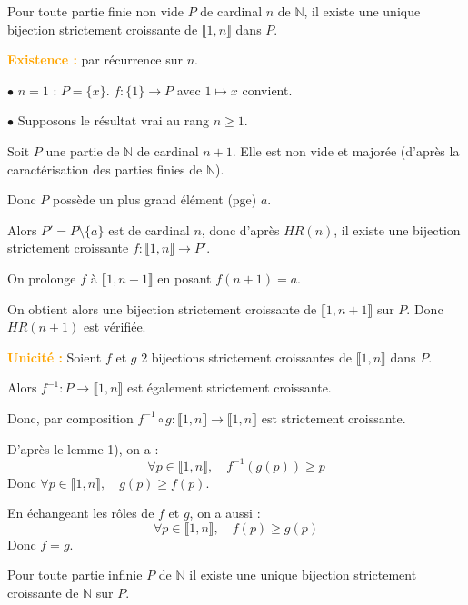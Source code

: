 \documentclass[a4paper,11pt]{article}
\newcommand{\N}{\mathbb{N}}
\newcommand{\cas}[1]{\textbf{\textcolor{orange}{#1}}}
\begin{document}
\begin{proposition}[1]
    Pour toute partie finie non vide $P$ de cardinal $n$ de $\N$, il existe une unique bijection strictement croissante de $\llbracket 1, n \rrbracket$ dans $P$.
\end{proposition}

\begin{demonstration}
    \cas{Existence :} par récurrence sur $n$.
    
    $\bullet$ $n=1$ : $P=\{x\}$. $f : \{1\} \to P$ avec $1 \mapsto x$ convient.
    
    $\bullet$ Supposons le résultat vrai au rang $n \ge 1$.
    
    Soit $P$ une partie de $\N$ de cardinal $n+1$.
    Elle est non vide et majorée (d'après la caractérisation des parties finies de $\N$).
    
    Donc $P$ possède un plus grand élément (pge) $a$.
    
    Alors $P' = P \setminus \{a\}$ est de cardinal $n$, donc d'après $HR(n)$, il existe une bijection strictement croissante $f : \llbracket 1, n \rrbracket \to P'$. 
    
    On prolonge $f$ à $\llbracket 1, n+1 \rrbracket$ en posant $f(n+1) = a$.
    
    On obtient alors une bijection strictement croissante de $\llbracket 1, n+1 \rrbracket$ sur $P$.
    Donc $HR(n+1)$ est vérifiée. 
    
    \vspace{10pt}
    \cas{Unicité :} Soient $f$ et $g$ 2 bijections strictement croissantes de $\llbracket 1, n \rrbracket$ dans $P$.
    
    Alors $f^{-1} : P \to \llbracket 1, n \rrbracket$ est également strictement croissante.
    
    Donc, par composition $f^{-1} \circ g : \llbracket 1, n \rrbracket \to \llbracket 1, n \rrbracket$ est strictement croissante.
    
    D'après le lemme 1), on a :
    \[
    \forall p \in \llbracket 1, n \rrbracket, \quad f^{-1}(g(p)) \ge p
    \]
    Donc $\forall p \in \llbracket 1, n \rrbracket, \quad g(p) \ge f(p)$.
    
    En échangeant les rôles de $f$ et $g$, on a aussi :
    \[
    \forall p \in \llbracket 1, n \rrbracket, \quad f(p) \ge g(p)
    \]
    Donc $f = g$. 
\end{demonstration}

\begin{proposition}[2]
    Pour toute partie infinie $P$ de $\N$ il existe une unique bijection strictement croissante de $\N$ sur $P$.
\end{proposition}
\end{document}
